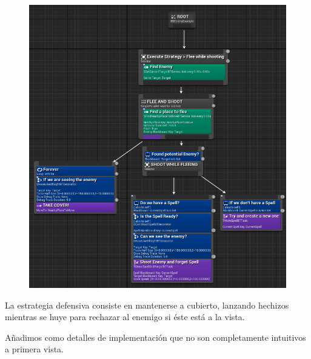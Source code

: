 \documentclass[12pt]{article}
\begin{document}
\begin{figure}[H]
    \centering
    \includegraphics[width=1\textwidth]{defensive_behavior_tree}
\end{figure}

La estrategia defensiva consiste en mantenerse a cubierto, lanzando hechizos mientras se huye para rechazar al enemigo si éste está a la vista.

Añadimos como detalles de implementación que no son completamente intuitivos a primera vista.
\end{document}
